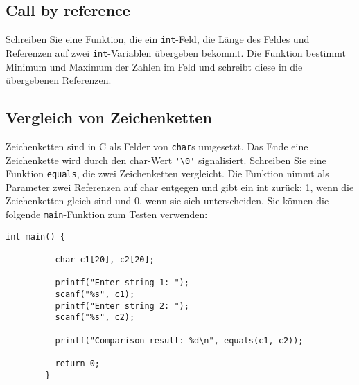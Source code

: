 \documentclass[]{article}
\begin{document}
	\subsection{Call by reference}
	
	Schreiben Sie eine Funktion, die ein \texttt{int}-Feld, die Länge des Feldes und Referenzen auf zwei \texttt{int}-Variablen übergeben bekommt.
	Die Funktion bestimmt Minimum und Maximum der Zahlen im Feld und schreibt diese in die übergebenen Referenzen.
	
	
	\subsection{Vergleich von Zeichenketten}
	
	Zeichenketten sind in C als Felder von \texttt{char}s umgesetzt.
	Das Ende eine Zeichenkette wird durch den char-Wert \lstinline|'\0'| signalisiert. 
	Schreiben Sie eine Funktion \texttt{equals}, die zwei Zeichenketten vergleicht.
	Die Funktion nimmt als Parameter zwei Referenzen auf char entgegen und gibt ein int zurück: 1, wenn die Zeichenketten gleich sind und 0, wenn sie sich unterscheiden. 
	Sie können die folgende \texttt{main}-Funktion zum Testen verwenden:
	
	\begin{lstlisting}[gobble=4]
		int main() {
		  
		  char c1[20], c2[20];
		  
		  printf("Enter string 1: ");
		  scanf("%s", c1);
		  printf("Enter string 2: ");
		  scanf("%s", c2);
		  
		  printf("Comparison result: %d\n", equals(c1, c2));
		  
		  return 0;
		}
	\end{lstlisting}
\end{document}
